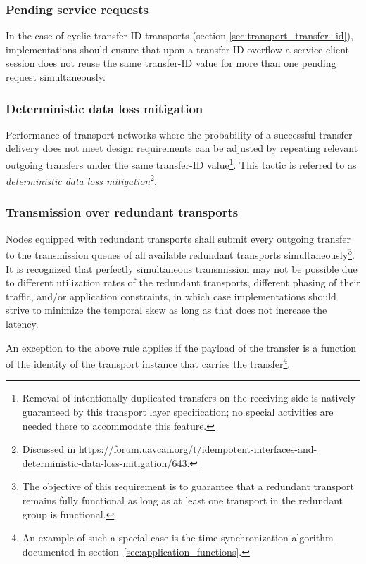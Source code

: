 \subsubsection{Pending service requests}

In the case of cyclic transfer-ID transports (section \ref{sec:transport_transfer_id}),
implementations should ensure that upon a transfer-ID overflow a service client session
does not reuse the same transfer-ID value for more than one pending request simultaneously.

\subsubsection{Deterministic data loss mitigation}\label{sec:transport_deterministic_data_loss_mitigation}

Performance of transport networks where the probability of a successful transfer delivery
does not meet design requirements can be adjusted by repeating relevant outgoing transfers
under the same transfer-ID value\footnote{%
    Removal of intentionally duplicated transfers on the receiving side is natively guaranteed
    by this transport layer specification;
    no special activities are needed there to accommodate this feature.
}.
This tactic is referred to as \emph{deterministic data loss mitigation}\footnote{%
    Discussed in
    \url{https://forum.uavcan.org/t/idempotent-interfaces-and-deterministic-data-loss-mitigation/643}.
}.

\subsubsection{Transmission over redundant transports}

Nodes equipped with redundant transports shall submit every outgoing transfer to the transmission queues of all
available redundant transports simultaneously\footnote{%
    The objective of this requirement is to guarantee that a redundant transport remains fully functional
    as long as at least one transport in the redundant group is functional.
}.
It is recognized that perfectly simultaneous transmission may not be possible due to different
utilization rates of the redundant transports, different phasing of their traffic, and/or application constraints,
in which case implementations should strive to minimize the temporal skew as long as that
does not increase the latency.

An exception to the above rule applies if the payload of the transfer is a function of
the identity of the transport instance that carries the transfer\footnote{%
    An example of such a special case is the time synchronization algorithm documented
    in section~\ref{sec:application_functions}.
}.

